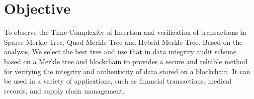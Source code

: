 \section{Objective}
\large
To observe the Time Complexity of Insertion and verification of transactions in Sparse Merkle Tree, Quad Merkle Tree and Hybrid Merkle Tree. Based on the analysis, 
We select the best tree and use that in data integrity audit scheme based on a Merkle tree and blockchain to provides a secure and reliable method for verifying the integrity and authenticity of data stored on a blockchain. It can be used in a variety of applications, such as financial transactions, medical records, and supply chain management.
